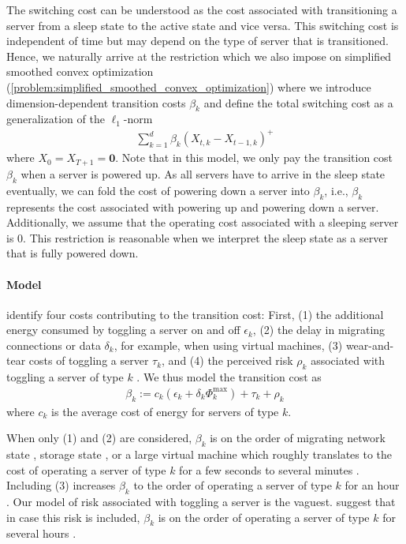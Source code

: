 The switching cost can be understood as the cost associated with transitioning a server from a sleep state to the active state and vice versa. This switching cost is independent of time but may depend on the type of server that is transitioned. Hence, we naturally arrive at the restriction which we also impose on simplified smoothed convex optimization (\autoref{problem:simplified_smoothed_convex_optimization}) where we introduce dimension-dependent transition costs $\beta_k$ and define the total switching cost as a generalization of the $\ell_1$-norm \begin{align*}
    \sum_{k=1}^d \beta_k (X_{t,k} - X_{t-1,k})^+
\end{align*} where $X_0 = X_{T+1} = \mathbf{0}$. Note that in this model, we only pay the transition cost $\beta_k$ when a server is powered up. As all servers have to arrive in the sleep state eventually, we can fold the cost of powering down a server into $\beta_k$, i.e., $\beta_k$ represents the cost associated with powering up and powering down a server. Additionally, we assume that the operating cost associated with a sleeping server is $0$. This restriction is reasonable when we interpret the sleep state as a server that is fully powered down.

\paragraph{Model} \citeauthor*{Lin2011} identify four costs contributing to the transition cost: First, (1) the additional energy consumed by toggling a server on and off $\epsilon_k$, (2) the delay in migrating connections or data $\delta_k$, for example, when using virtual machines, (3) wear-and-tear costs of toggling a server $\tau_k$, and (4) the perceived risk $\rho_k$ associated with toggling a server of type $k$ \cite{Lin2011}. We thus model the transition cost as \begin{align*}
    \beta_k := c_k(\epsilon_k + \delta_k \Phi_k^{\text{max}}) + \tau_k + \rho_k
\end{align*} where $c_k$ is the average cost of energy for servers of type $k$.

When only (1) and (2) are considered, $\beta_k$ is on the order of migrating network state \cite{Chen2008}, storage state \cite{Thereska2009}, or a large virtual machine \cite{Clark2005} which roughly translates to the cost of operating a server of type $k$ for a few seconds to several minutes \cite{Lin2011}. Including (3) increases $\beta_k$ to the order of operating a server of type $k$ for an hour \cite{Bodik2008}. Our model of risk associated with toggling a server is the vaguest. \citeauthor*{Lin2011} suggest that in case this risk is included, $\beta_k$ is on the order of operating a server of type $k$ for several hours \cite{Lin2011}.

